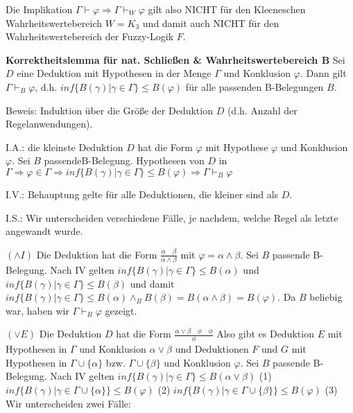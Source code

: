 \documentclass[a4paper]{article}
\renewcommand{\note}[2]{\begin{noteBox} \textbf{#1} #2 \end{noteBox}}
\begin{document}
\begin{multicols}{3}
  Die Implikation $\Gamma\vdash\varphi\Rightarrow\Gamma\vdash_W \varphi$ gilt also NICHT für den Kleeneschen Wahrheitswertebereich $W=K_3$ und damit auch NICHT für den Wahrheitswertebereich der Fuzzy-Logik $F$.

  \note{Korrektheitslemma für nat. Schließen \& Wahrheitswertebereich B}{Sei $D$ eine Deduktion mit Hypothesen in der Menge $\Gamma$ und Konklusion $\varphi$. Dann gilt $\Gamma\vdash_B \varphi$, d.h. $inf\{B(\gamma)|\gamma\in\Gamma\}\leq B(\varphi)$ für alle passenden B-Belegungen $B$.}

  Beweis: Induktion über die Größe der Deduktion $D$ (d.h. Anzahl der Regelanwendungen).
  \begin{itemize*}
    \item I.A.: die kleinste Deduktion $D$ hat die Form $\varphi$ mit Hypothese $\varphi$ und Konklusion $\varphi$. Sei $B$ passendeB-Belegung. Hypothesen von $D$ in $\Gamma\Rightarrow\varphi\in\Gamma\Rightarrow inf\{B(\gamma)|\gamma\in\Gamma\}\leq B(\varphi)\Rightarrow\Gamma\vdash_B \varphi$
    \item I.V.: Behauptung gelte für alle Deduktionen, die kleiner sind als $D$.
    \item I.S.: Wir unterscheiden verschiedene Fälle, je nachdem, welche Regel als letzte angewandt wurde.
    \begin{itemize*}
      \item $(\wedge I)$ Die Deduktion hat die Form $\frac{\alpha\quad\beta}{\alpha\wedge\beta}$
      mit $\varphi=\alpha\wedge\beta$. Sei $B$ passende B-Belegung. Nach IV gelten $inf\{B(\gamma)|\gamma\in\Gamma\}\leq B(\alpha)$ und $inf\{B(\gamma)|\gamma\in\Gamma\}\leq B(\beta)$
      und damit
      $inf\{B(\gamma)|\gamma\in\Gamma\}\leq B(\alpha)\wedge_B B(\beta)=B(\alpha\wedge\beta) =B(\varphi)$.
      Da $B$ beliebig war, haben wir $\Gamma\vdash_B \varphi$ gezeigt.
      \item $(\vee E)$ Die Deduktion $D$ hat die Form $\frac{\alpha\vee\beta\quad\phi\quad\phi}{\phi}$
      Also gibt es Deduktion $E$ mit Hypothesen in $\Gamma$ und Konklusion $\alpha\vee\beta$ und Deduktionen $F$ und $G$ mit Hypothesen in $\Gamma\cup\{\alpha\}$ bzw. $\Gamma\cup\{\beta\}$ und Konklusion $\varphi$. Sei $B$ passende B-Belegung. Nach IV gelten
      $inf\{B(\gamma)|\gamma\in\Gamma\}\leq B(\alpha\vee\beta)$ (1)
      $inf\{B(\gamma)|\gamma\in\Gamma\cup\{\alpha\}\}\leq B(\varphi)$ (2)
      $inf\{B(\gamma)|\gamma\in\Gamma\cup\{\beta\}\}\leq B(\varphi)$ (3)
      Wir unterscheiden zwei Fälle:
      \begin{itemize*}

\end{itemize*}
\end{itemize*}
\end{itemize*}
\end{multicols}
\end{document}
